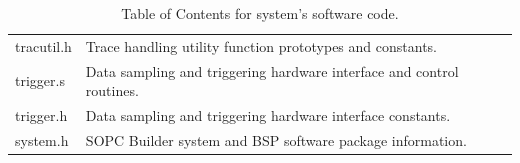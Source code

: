 \documentclass[titlepage]{scrartcl}
\begin{document}
\begin{appendices}
\begin{table}[b!]
\begin{center}
\begin{tabular}{p{3cm} p{10cm} p{1cm}}
		 tracutil.h & Trace handling utility function prototypes and constants. & \thecodepage \\ \addtocounter{codepage}{2}
		 trigger.s & Data sampling and triggering hardware interface and control routines. & \thecodepage \\ \addtocounter{codepage}{9}
		 trigger.h & Data sampling and triggering hardware interface constants. & \thecodepage \\ \addtocounter{codepage}{1}
		 system.h & SOPC Builder system and BSP software package information. & \thecodepage 
		\end{tabular}
		\end{center}
              \caption{Table of Contents for system's software code.}
	     \label{tab:code_toc}
	\end{table}

	\clearpage

	

	\end{appendices}
	
	
\end{document}
